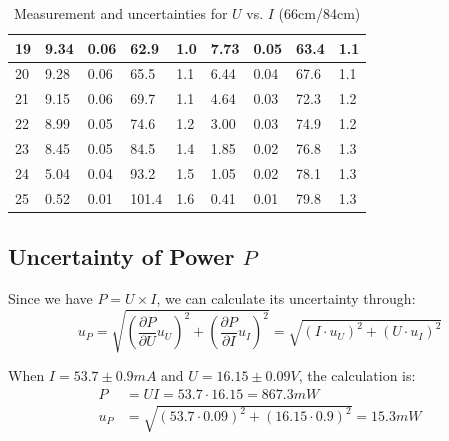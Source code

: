 \documentclass[12pt, a4paper]{article}
\begin{document}
\begin{table}[H]
\begin{center}
\begin{tabular}{|l|llll|llll|}
	19 & \multicolumn{1}{l|}{9.34}   & \multicolumn{1}{l|}{0.06}     & \multicolumn{1}{l|}{62.9}    & 1.0       & \multicolumn{1}{l|}{7.73}   & \multicolumn{1}{l|}{0.05}     & \multicolumn{1}{l|}{63.4}    & 1.1       \\ \hline
	20 & \multicolumn{1}{l|}{9.28}   & \multicolumn{1}{l|}{0.06}     & \multicolumn{1}{l|}{65.5}    & 1.1       & \multicolumn{1}{l|}{6.44}   & \multicolumn{1}{l|}{0.04}     & \multicolumn{1}{l|}{67.6}    & 1.1       \\ \hline
	21 & \multicolumn{1}{l|}{9.15}   & \multicolumn{1}{l|}{0.06}     & \multicolumn{1}{l|}{69.7}    & 1.1       & \multicolumn{1}{l|}{4.64}   & \multicolumn{1}{l|}{0.03}     & \multicolumn{1}{l|}{72.3}    & 1.2       \\ \hline
	22 & \multicolumn{1}{l|}{8.99}   & \multicolumn{1}{l|}{0.05}     & \multicolumn{1}{l|}{74.6}    & 1.2       & \multicolumn{1}{l|}{3.00}   & \multicolumn{1}{l|}{0.03}     & \multicolumn{1}{l|}{74.9}    & 1.2       \\ \hline
	23 & \multicolumn{1}{l|}{8.45}   & \multicolumn{1}{l|}{0.05}     & \multicolumn{1}{l|}{84.5}    & 1.4       & \multicolumn{1}{l|}{1.85}   & \multicolumn{1}{l|}{0.02}     & \multicolumn{1}{l|}{76.8}    & 1.3       \\ \hline
	24 & \multicolumn{1}{l|}{5.04}   & \multicolumn{1}{l|}{0.04}     & \multicolumn{1}{l|}{93.2}    & 1.5       & \multicolumn{1}{l|}{1.05}   & \multicolumn{1}{l|}{0.02}     & \multicolumn{1}{l|}{78.1}    & 1.3       \\ \hline
	25 & \multicolumn{1}{l|}{0.52}   & \multicolumn{1}{l|}{0.01}     & \multicolumn{1}{l|}{101.4}   & 1.6       & \multicolumn{1}{l|}{0.41}   & \multicolumn{1}{l|}{0.01}     & \multicolumn{1}{l|}{79.8}    & 1.3       \\ \hline
	\end{tabular}
	\caption{Measurement and uncertainties for $U$ vs. $I$ (66cm/84cm)}
	\end{center}
\end{table}

\subsection{Uncertainty of Power $P$}
Since we have $P = U \times I$, we can calculate its uncertainty through:
$$
u_P = \sqrt{(\frac{\partial P}{\partial U}u_U)^2 + (\frac{\partial P}{\partial I}u_I)^2} = \sqrt{(I\cdot u_U)^2 + (U \cdot u_I)^2}
$$

When $I = 53.7 \pm 0.9 mA$ and $U = 16.15 \pm 0.09 V$, the calculation is:
\begin{align*}
	P &= UI = 53.7 \cdot 16.15 = 867.3 mW \\
	u_P &= \sqrt{(53.7 \cdot 0.09)^2 + (16.15 \cdot 0.9)^2} = 15.3 mW
\end{align*}
\end{document}
